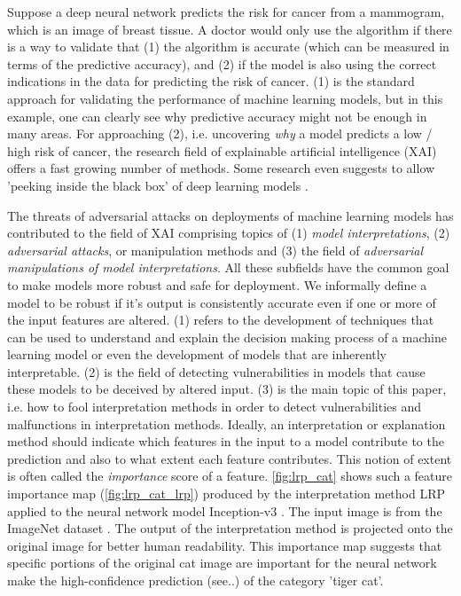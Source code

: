 \documentclass[sigconf]{acmart}
\begin{document}
Suppose a deep neural network predicts the risk for cancer from a mammogram, which is an image of breast tissue. A doctor would only use the algorithm if there is a way to validate that (1) the algorithm is accurate (which can be measured in terms of the predictive accuracy), and (2) if the model is also using the correct indications in the data for predicting the risk of cancer. (1) is the standard approach for validating the performance of machine learning models, but in this example, one can clearly see why predictive accuracy might not be enough in many areas. For approaching (2), i.e. uncovering \textit{why} a model predicts a low / high risk of cancer, the research field of explainable artificial intelligence (XAI) offers a fast growing number of methods. Some research even suggests to allow 'peeking inside the black box' of deep learning models \cite{adadi2018peeking}.  


The threats of adversarial attacks on deployments of machine learning models has contributed to the field of XAI comprising topics of (1) \textit{model interpretations}, (2) \textit{adversarial attacks}, or manipulation methods and (3) the field of \textit{adversarial manipulations of model interpretations}. All these subfields have the common goal to make models more robust and safe for deployment. We informally define a model to be robust if it's output is consistently accurate even if one or more of the input features are altered. 
(1) refers to the development of techniques that can be used to understand and explain the decision making process of a machine learning model or even the development of models that are inherently interpretable. (2) is the field of detecting vulnerabilities in models that cause these models to be deceived by altered input. 
(3) is the main topic of this paper, i.e. how to fool interpretation methods in order to detect vulnerabilities and malfunctions in interpretation methods. 
Ideally, an interpretation or explanation method should indicate which features in the input to a model contribute to the prediction and also to what extent each feature contributes. This notion of extent is often called the \textit{importance} score of a feature. \autoref{fig:lrp_cat} shows such a feature importance map (\autoref{fig:lrp_cat_lrp}) produced by the interpretation method LRP \cite{bach2015pixel} applied to the neural network model Inception-v3 \cite{szegedy2016rethinking}. The input image is from the ImageNet dataset \cite{ILSVRC15}. The output of the interpretation method is projected onto the original image for better human readability. This importance map suggests that specific portions of the original cat image are important for the neural network make the high-confidence prediction (see..) of the category 'tiger cat'. 
\end{document}
